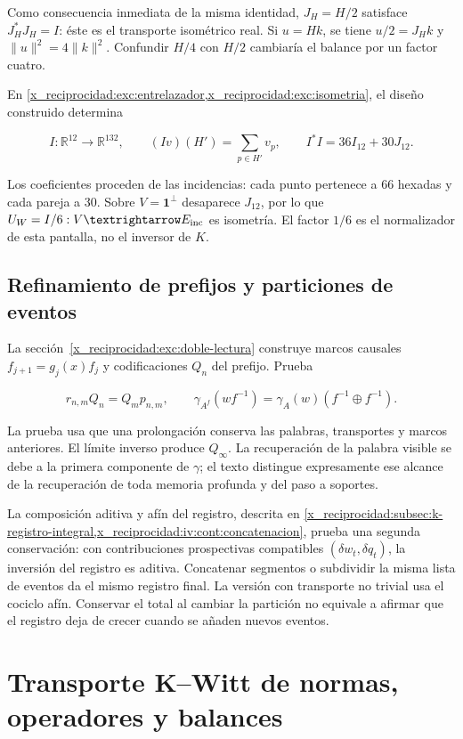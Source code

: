 Como consecuencia inmediata de la misma identidad, \(J_H=H/2\) satisface \(J_H^*J_H=I\): éste es el transporte isométrico real. Si \(u=Hk\), se tiene \(u/2=J_Hk\) y \(\|u\|^2=4\|k\|^2\). Confundir \(H/4\) con \(H/2\) cambiaría el balance por un factor cuatro.

En \cref{x_reciprocidad:exc:entrelazador,x_reciprocidad:exc:isometria}, el diseño construido determina

\[
I:\mathbb R^{12}\to\mathbb R^{132},\qquad
(Iv)(H')=\sum_{p\in H'}v_p,\qquad I^*I=36I_{12}+30J_{12}.
\]

Los coeficientes proceden de las incidencias: cada punto pertenece a 66 hexadas y cada pareja a 30. Sobre \(V=\mathbf1^\perp\) desaparece \(J_{12}\), por lo que \(U_W=I/6:V\to E_{\rm inc}\) es isometría. El factor \(1/6\) es el normalizador de esta pantalla, no el inversor de \(K\).

\subsection{Refinamiento de prefijos y particiones de eventos}

La sección~\ref{x_reciprocidad:exc:doble-lectura} construye marcos causales \(f_{j+1}=g_j(x)f_j\) y codificaciones \(Q_n\) del prefijo. Prueba

\[
r_{n,m}Q_n=Q_mp_{n,m},\qquad
\gamma_{A^f}(wf^{-1})=\gamma_A(w)(f^{-1}\oplus f^{-1}).
\]

La prueba usa que una prolongación conserva las palabras, transportes y marcos anteriores. El límite inverso produce \(Q_\infty\). La recuperación de la palabra visible se debe a la primera componente de \(\gamma\); el texto distingue expresamente ese alcance de la recuperación de toda memoria profunda y del paso a soportes.

La composición aditiva y afín del registro, descrita en \cref{x_reciprocidad:subsec:k-registro-integral,x_reciprocidad:iv:cont:concatenacion}, prueba una segunda conservación: con contribuciones prospectivas compatibles \((\delta w_t,\delta q_t)\), la inversión del registro es aditiva. Concatenar segmentos o subdividir la misma lista de eventos da el mismo registro final. La versión con transporte no trivial usa el cociclo afín. Conservar el total al cambiar la partición no equivale a afirmar que el registro deja de crecer cuando se añaden nuevos eventos.

\section{Transporte K–Witt de normas, operadores y balances}\label{x_reciprocidad:nuc04:kwitt}

